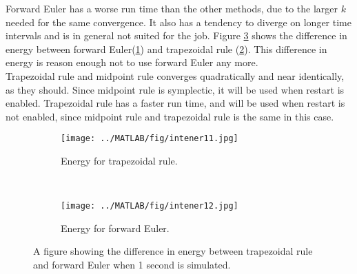 Forward Euler has a worse run time than the other methods, due to the larger $k$ needed for the same convergence. It also has a tendency to diverge on longer time intervals and is in general not suited for the job. Figure \ref{fig:forwardenergy} shows the difference in energy between forward Euler(\ref{fig:fe1}) and trapezoidal rule (\ref{fig:fe2}). This difference in energy is reason enough not to use forward Euler any more.\\

Trapezoidal rule and midpoint rule converges quadratically and near identically, as they should. Since midpoint rule is symplectic, it will be used when restart is enabled. Trapezoidal rule has a faster run time, and will be used when restart is not enabled, since midpoint rule and trapezoidal rule is the same in this case.

\begin{figure}[H]
        \centering
        \begin{subfigure}[b]{0.45\textwidth}
                \texttt{[image: ../MATLAB/fig/intener11.jpg]}
                \caption{ Energy for trapezoidal rule. }
                \label{fig:fe1}
        \end{subfigure}
        ~
        \begin{subfigure}[b]{0.45\textwidth}
                \texttt{[image: ../MATLAB/fig/intener12.jpg]}
                \caption{ Energy for forward Euler. }  
				\label{fig:fe2}
        \end{subfigure}                
\caption{ A figure showing the difference in energy between trapezoidal rule and forward Euler when 1 second is simulated. }
\label{fig:forwardenergy}
\end{figure}

